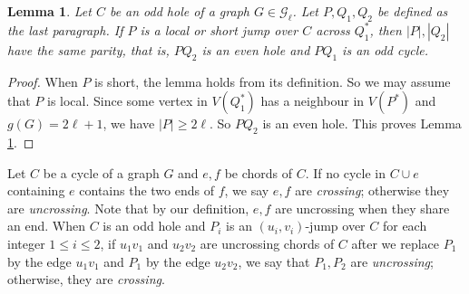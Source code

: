 \documentclass[11pt]{article}
\newtheorem{lemma}[theorem]{Lemma}
\begin{document}
\begin{lemma}\label{jump parity}
Let $C$ be an odd hole of a graph $G\in \mathcal{G}_{\ell}$. Let $P,Q_1,Q_2$ be defined as the last paragraph. If $P$ is a local or short jump over $C$ across $Q^*_1$, then $|P|,|Q_2|$ have the same parity, that is, $PQ_2$ is an even hole and $PQ_1$ is an odd cycle.
\end{lemma}
\begin{proof}
When $P$ is short, the lemma holds from its definition. So we may assume that $P$ is local. Since some vertex in $V(Q^*_1)$ has a neighbour in $V(P^*)$ and $g(G)=2\ell+1$, we have $|P|\geq 2\ell$. So $PQ_2$ is an even hole. This proves Lemma \ref{jump parity}.
\end{proof}

Let $C$ be a cycle of a graph $G$ and $e,f$ be chords of $C$. If no cycle in $C\cup e$ containing $e$ contains the two ends of $f$, we say $e,f$ are {\em crossing}; otherwise they are {\em uncrossing}. Note that by our definition, $e,f$ are uncrossing when they share an end. When $C$ is an odd hole and $P_i$ is an $(u_i,v_i)$-jump over $C$ for each integer $1\leq i\leq2$, if $u_1v_1$ and $u_2v_2$ are uncrossing chords of $C$ after we replace $P_1$ by the edge $u_1v_1$ and $P_1$ by the edge $u_2v_2$, we say that $P_1,P_2$ are {\em uncrossing}; otherwise, they are {\em crossing}.

\end{document}
